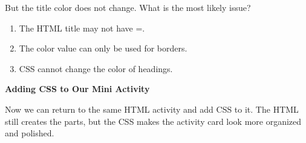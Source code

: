 \documentclass{article}
\begin{document}
But the title color does not change. What is the most likely issue?

\begin{enumerate}[label=\Alph*), topsep=4pt, itemsep=2pt, partopsep=0pt]
  \item The HTML title may not have =.
  \item The color value  can only be used for borders.
  \item CSS cannot change the color of headings.
\end{enumerate}

\vspace{0.5cm}

\pagebreak

\textbf{\Bitter\textcolor{naranja}{Adding CSS to Our Mini Activity}}

\vspace{0.1cm}

Now we can return to the same HTML activity and add CSS to it.
The HTML still creates the parts, but the CSS makes the activity card look more organized and polished.

\vspace{0.3cm}
\end{document}

